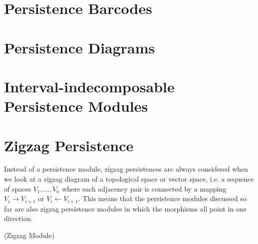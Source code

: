 \section{Persistence Barcodes}
\label{persistencebarcodes}

\section{Persistence Diagrams}
\label{persistencediagrams}

\section{Interval-indecomposable Persistence Modules}
\label{intervaldinecomposition}

\section{Zigzag Persistence}
Instead of a persistence module, zigzag persistences are always considered when we look at a zigzag diagram of a topological space or vector space, i.e. a sequence of spaces $V_1, \ldots, V_n$ where each adjacency pair is connected by a mapping $V_i \rightarrow V_{i+1}$ or $V_i \leftarrow V_{i+1}$. This means that the persistence modules discussed so far are also zigzag persistence modules in which the morphisms all point in one direction.

\begin{definition}{(Zigzag Module) \cite[§2.1]{}}

\end{definition}

